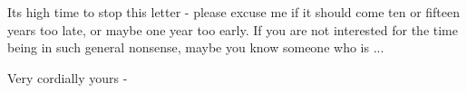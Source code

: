 
Its high time to stop this letter - please excuse me if it should
come ten or fifteen years too late, or maybe one year too early. If you
are not interested for the time being in such general nonsense, maybe
you know someone who is ...

Very cordially yours\hand{,} - 

